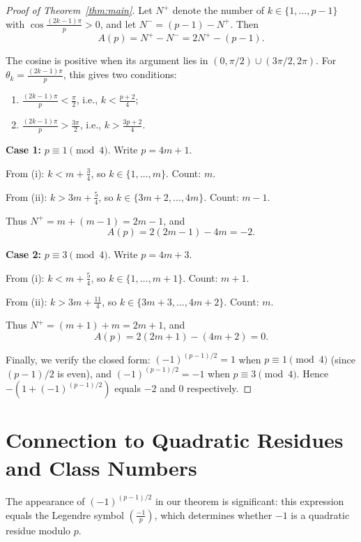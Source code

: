 \documentclass[11pt,a4paper]{article}
\begin{document}
\begin{proof}[Proof of Theorem~\ref{thm:main}]
Let $N^+$ denote the number of $k \in \{1, \ldots, p-1\}$ with $\cos\frac{(2k-1)\pi}{p} > 0$, and let $N^- = (p-1) - N^+$. Then
\[
A(p) = N^+ - N^- = 2N^+ - (p-1).
\]

The cosine is positive when its argument lies in $(0, \pi/2) \cup (3\pi/2, 2\pi)$. For $\theta_k = \frac{(2k-1)\pi}{p}$, this gives two conditions:

\begin{enumerate}
\item[(i)] $\frac{(2k-1)\pi}{p} < \frac{\pi}{2}$, i.e., $k < \frac{p+2}{4}$;
\item[(ii)] $\frac{(2k-1)\pi}{p} > \frac{3\pi}{2}$, i.e., $k > \frac{3p+2}{4}$.
\end{enumerate}

\textbf{Case 1:} $p \equiv 1 \pmod 4$. Write $p = 4m + 1$.

From (i): $k < m + \frac{3}{4}$, so $k \in \{1, \ldots, m\}$. Count: $m$.

From (ii): $k > 3m + \frac{5}{4}$, so $k \in \{3m+2, \ldots, 4m\}$. Count: $m - 1$.

Thus $N^+ = m + (m-1) = 2m - 1$, and
\[
A(p) = 2(2m-1) - 4m = -2.
\]

\textbf{Case 2:} $p \equiv 3 \pmod 4$. Write $p = 4m + 3$.

From (i): $k < m + \frac{5}{4}$, so $k \in \{1, \ldots, m+1\}$. Count: $m + 1$.

From (ii): $k > 3m + \frac{11}{4}$, so $k \in \{3m+3, \ldots, 4m+2\}$. Count: $m$.

Thus $N^+ = (m+1) + m = 2m + 1$, and
\[
A(p) = 2(2m+1) - (4m+2) = 0.
\]

Finally, we verify the closed form: $(-1)^{(p-1)/2} = 1$ when $p \equiv 1 \pmod 4$ (since $(p-1)/2$ is even), and $(-1)^{(p-1)/2} = -1$ when $p \equiv 3 \pmod 4$. Hence $-(1 + (-1)^{(p-1)/2})$ equals $-2$ and $0$ respectively.
\end{proof}

\section{Connection to Quadratic Residues and Class Numbers}\label{sec:connection}

The appearance of $(-1)^{(p-1)/2}$ in our theorem is significant: this expression equals the Legendre symbol $\left(\frac{-1}{p}\right)$, which determines whether $-1$ is a quadratic residue modulo $p$.
\end{document}
